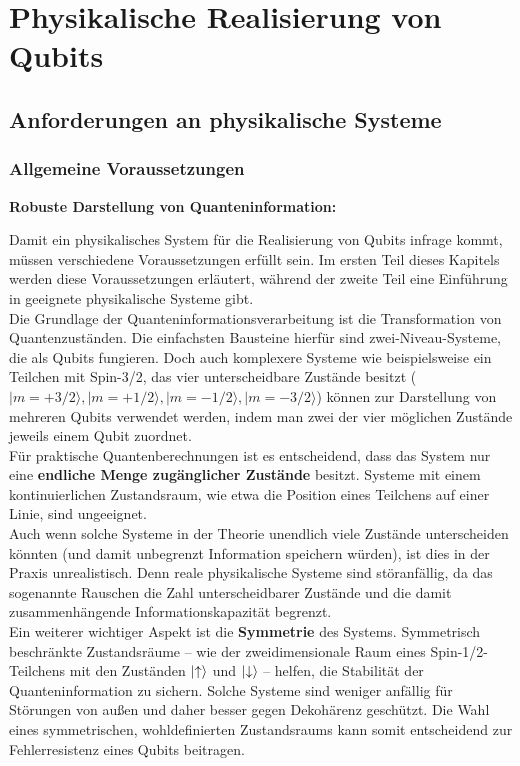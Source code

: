 \section{Physikalische Realisierung von Qubits }
\subsection{Anforderungen an physikalische Systeme }
\subsubsection{Allgemeine Voraussetzungen}

\textbf{Robuste Darstellung von Quanteninformation:}

Damit ein physikalisches System für die Realisierung von Qubits infrage kommt, müssen verschiedene Voraussetzungen erfüllt sein. Im ersten Teil dieses Kapitels werden diese Voraussetzungen erläutert, während der zweite Teil eine Einführung in geeignete physikalische Systeme gibt.\\

 
Die Grundlage der Quanteninformationsverarbeitung ist die Transformation von Quantenzuständen. Die einfachsten Bausteine hierfür sind zwei-Niveau-Systeme, die als Qubits fungieren. Doch auch komplexere Systeme wie beispielsweise ein Teilchen mit Spin-3/2, das vier unterscheidbare Zustände besitzt ($|m = +3/2\rangle, |m = +1/2\rangle, |m = -1/2\rangle, |m = -3/2\rangle$) 
können zur Darstellung von mehreren Qubits verwendet werden, 
indem man zwei der vier möglichen Zustände jeweils einem Qubit zuordnet.\\

Für praktische Quantenberechnungen ist es entscheidend, dass das System nur eine \textbf{endliche Menge zugänglicher Zustände} besitzt. Systeme mit einem kontinuierlichen Zustandsraum, wie etwa die Position eines Teilchens auf einer Linie, sind ungeeignet. \\
Auch wenn solche Systeme in der Theorie unendlich viele Zustände unterscheiden könnten (und damit unbegrenzt Information speichern würden), ist dies in der Praxis unrealistisch. Denn reale physikalische Systeme sind störanfällig, da das sogenannte Rauschen die Zahl unterscheidbarer Zustände und die damit zusammenhängende Informationskapazität begrenzt. \\

Ein weiterer wichtiger Aspekt ist die \textbf{Symmetrie} des Systems. Symmetrisch beschränkte Zustandsräume – wie der zweidimensionale Raum eines Spin-1/2-Teilchens mit den Zuständen $\ket{\uparrow}$ und $\ket{\downarrow}$ – helfen, die Stabilität der Quanteninformation zu sichern. Solche Systeme sind weniger anfällig für Störungen von außen und daher besser gegen Dekohärenz geschützt. Die Wahl eines symmetrischen, wohldefinierten Zustandsraums kann somit entscheidend zur Fehlerresistenz eines Qubits beitragen.

